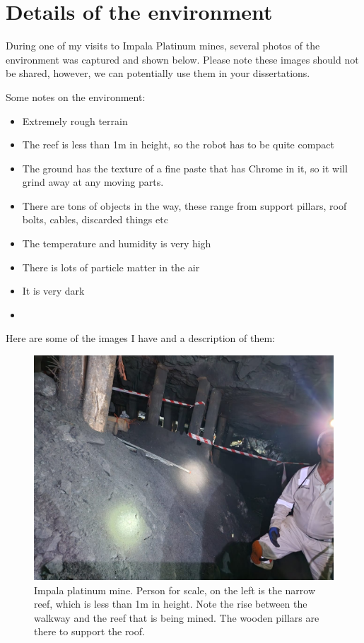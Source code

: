 \section{Details of the environment}
	During one of my visits to Impala Platinum mines, several photos of the environment was captured and shown below. Please note these images should not be shared, however, we can potentially use them in your dissertations. 
	
	Some notes on the environment:
	
	\begin{itemize}
		\item Extremely rough terrain
		\item The reef is less than 1m in height, so the robot has to be quite compact
		\item The ground has the texture of a fine paste that has Chrome in it, so it will grind away at any moving parts. 
		\item There are tons of objects in the way, these range from support pillars, roof bolts, cables, discarded things etc
		\item The temperature and humidity is very high
		\item There is lots of particle matter in the air
		\item It is very dark
		\item 
	\end{itemize}

	Here are some of the images I have and a description of them:

	\begin{figure}[H]
		\centering
		\includegraphics[width=0.7\linewidth]{Images/Impala1}
		\caption{Impala platinum mine. Person for scale, on the left is the narrow reef, which is less than 1m in height. Note the rise between the walkway and the reef that is being mined. The wooden pillars are there to support the roof.}
		\label{fig:Impala1}
	\end{figure}


